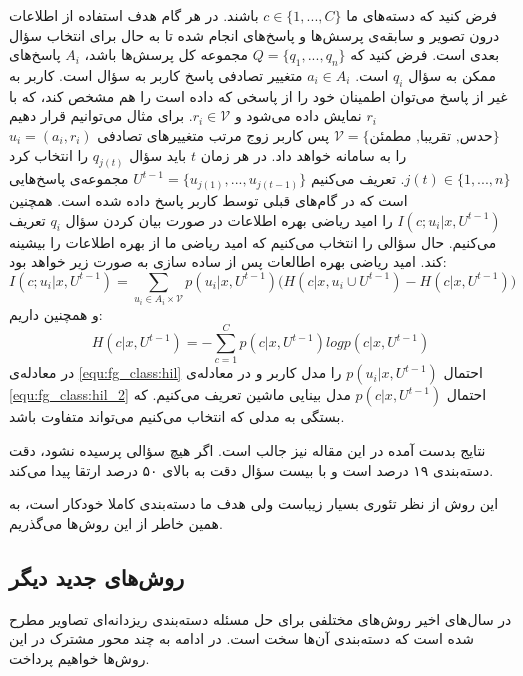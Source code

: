 \documentclass[11pt]{article}
\begin{document}
فرض کنید که دسته‌های ما
$c \in \{1, ..., C\}$ باشند.
در هر گام هدف استفاده از اطلاعات درون تصویر و سابقه‌ی پرسش‌ها و پاسخ‌های انجام شده تا به حال برای انتخاب سؤال بعدی است.
فرض کنید که
$Q = \{q_1, ..., q_n\}$
 مجموعه کل پرسش‌ها باشد،
$A_i$ پاسخ‌های ممکن به سؤال
$q_i$ است.
$a_i \in A_i$
متغییر تصادفی پاسخ کاربر به سؤال است. کاربر به غیر از پاسخ می‌توان اطمینان خود را از پاسخی که داده است را هم مشخص کند، که با
$r_i$ نمایش داده می‌شود و
$r_i \in \mathcal{V}$. برای مثال می‌توانیم قرار دهیم
$\mathcal{V} = \{ \text{حدس, تقریبا, مطمئن} \}$
پس کاربر زوج مرتب متغییر‌های تصادفی
$u_i = ( a_i, r_i )$
را به سامانه خواهد داد.
در هر زمان $t$ باید سؤال
$q_{j(t)}$ را انتخاب کرد
$j(t) \in \{ 1, ..., n \} $.
تعریف می‌کنیم
$ U^{t-1} = \{ u_{j(1)}, ..., u_{j(t-1)} \} $
مجموعه‌ی پاسخ‌هایی است که در گام‌های قبلی توسط کاربر پاسخ داده شده است.
همچنین
$I(c; u_i | x, U^{t-1})$ را امید ریاضی بهره اطلاعات در صورت بیان کردن سؤال
$q_i$ تعریف می‌کنیم.
حال سؤالی را انتخاب می‌کنیم که امید ریاضی ما از بهره اطلاعات را بیشینه کند. امید ریاضی بهره اطالعات پس از ساده‌ سازی به صورت زیر خواهد بود:
\begin{equation}
	\label{equ:fg_class:hil}
	I(c; u_i | x, U^{t-1}) = \sum_{u_i \in A_i \times \mathcal{V}} p(u_i | x, U ^{t-1}) \bigg( H(c| x, u_i \cup U ^{t-1}) - H( c | x, U ^{t-1} ) \bigg)
\end{equation}
و همچنین داریم:
\begin{equation}
	\label{equ:fg_class:hil_2}
	H( c | x, U ^{t-1} ) = - \sum_{c=1}^{C} p(c|x, U ^{t-1}) log p(c|x, U ^{t-1})
\end{equation}
در معادله‌ی
\ref{equ:fg_class:hil}
احتمال
$p(u_i | x, U ^{t-1})$
را مدل کاربر و در معادله‌ی
\ref{equ:fg_class:hil_2}
احتمال
$p(c|x, U ^{t-1})$
مدل بینایی ماشین تعریف می‌کنیم. که بستگی به مدلی که انتخاب می‌کنیم می‌تواند متفاوت باشد.

نتایج بدست آمده در این
\cite{branson2010}
مقاله نیز جالب است.
اگر هیچ سؤالی پرسیده نشود، دقت دسته‌بندی ۱۹ درصد است و با بیست سؤال دقت به بالای ۵۰ درصد ارتقا پیدا می‌کند.

این روش از نظر تئوری بسیار زیباست ولی هدف ما دسته‌بندی کاملا خودکار است، به همین خاطر از این روش‌ها می‌گذریم.

\subsection{روش‌های جدید دیگر}\label{sec:fg_class:new}
در سال‌های اخیر روش‌های مختلفی برای حل مسئله دسته‌بندی ریزدانه‌ای تصاویر مطرح شده است که دسته‌بندی آن‌ها سخت است. در ادامه به چند محور مشترک در این روش‌ها خواهیم پرداخت.
\end{document}
